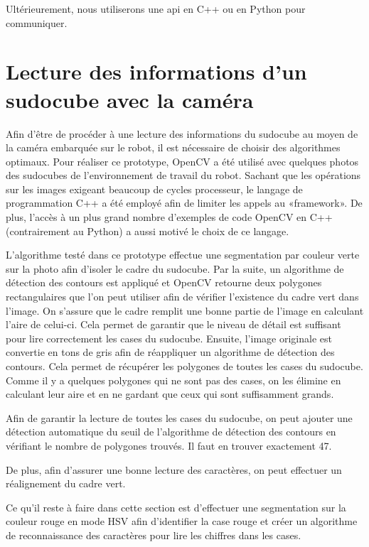 Ultérieurement, nous utiliserons une api en C++ ou en Python pour communiquer.

\section{Lecture des informations d'un sudocube avec la caméra}
Afin d'être de procéder à une lecture des informations du sudocube au moyen de la caméra embarquée sur le robot, il est nécessaire de choisir des algorithmes optimaux. Pour réaliser ce prototype, OpenCV a été utilisé avec quelques photos des sudocubes de l’environnement de travail du robot. Sachant que les opérations sur les images exigeant beaucoup de cycles processeur, le langage de programmation C++ a été employé afin de limiter les appels au «framework». De plus, l'accès à un plus grand nombre d'exemples de code OpenCV en C++(contrairement au Python) a aussi motivé le choix de ce langage.

L'algorithme testé dans ce prototype effectue une segmentation par couleur verte sur la photo afin d'isoler le cadre du sudocube. Par la suite, un algorithme de détection des contours est appliqué et OpenCV retourne deux polygones rectangulaires que l'on peut utiliser afin de vérifier l'existence du cadre vert dans l'image. On s'assure que le cadre remplit une bonne partie de l'image en calculant l'aire de celui-ci. Cela permet de garantir que le niveau de détail est suffisant pour lire correctement les cases du sudocube. Ensuite, l'image originale est convertie en tons de gris afin de réappliquer un algorithme de détection des contours. Cela permet de récupérer les polygones de toutes les cases du sudocube. Comme il y a quelques polygones qui ne sont pas des cases, on les élimine en calculant leur aire et en ne gardant que ceux qui sont suffisamment grands.

Afin de garantir la lecture de toutes les cases du sudocube, on peut ajouter une détection automatique du seuil de l'algorithme de détection des contours en vérifiant le nombre de polygones trouvés. Il faut en trouver exactement 47.

De plus, afin d'assurer une bonne lecture des caractères, on peut effectuer un réalignement du cadre vert.

Ce qu'il reste à faire dans cette section est d'effectuer une segmentation sur la couleur rouge en mode HSV afin d'identifier la case rouge et créer un algorithme de reconnaissance des caractères pour lire les chiffres dans les cases.

